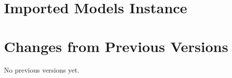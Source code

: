 \documentclass[11pt,a4paper]{ivoa}
\begin{document}
% 

% 

% 

% 

% 

\section{Imported Models Instance}

\section{Changes from Previous Versions}

No previous versions yet.



\end{document}
